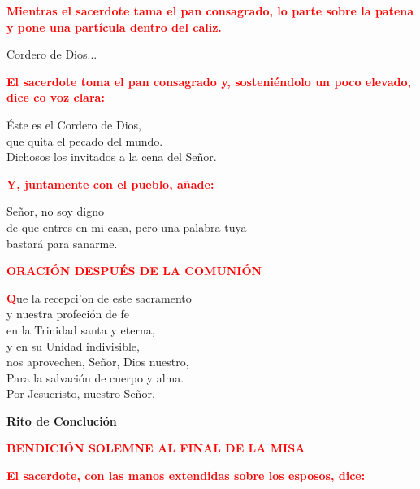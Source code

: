 \documentclass[12pt, letterpaper, spanish]{report}
\begin{document}
\large{\bfseries \textcolor{red}{Mientras el sacerdote tama el pan consagrado, lo parte sobre la patena y pone una part\'icula dentro del caliz.}}\newline

\Large Cordero de Dios...\newline

\large{\bfseries \textcolor{red}{El sacerdote toma el pan consagrado y, sosteni\'endolo un poco elevado, dice co voz clara:}}\newline

\Large \'Este es el Cordero de Dios,\\
que quita el pecado del mundo.\\
Dichosos los invitados a la cena del Se\~nor.\newline

\large{\bfseries \textcolor{red}{Y, juntamente con el pueblo, a\~nade:}}\newline

\Large Se\~nor, no soy digno\\
de que entres en mi casa,
pero una palabra tuya\\
bastar\'a para sanarme.\newline

\Large {\bfseries \textcolor{red}{ORACI\'ON DESPU\'ES DE LA COMUNI\'ON}} \newline

\Large \lettrine{\bfseries \textcolor{red}{Q}}{}ue la recepci'on de este sacramento\\
y nuestra profeci\'on de fe\\
en la Trinidad santa y eterna,\\
y en su Unidad indivisible,\\
nos aprovechen, Se\~nor, Dios nuestro,\\
Para la salvaci\'on de cuerpo y alma.\\
Por Jesucristo, nuestro Se\~nor.\newline

\begin{center}
\Huge {\bfseries Rito de Concluci\'on}
\end{center}

\Large {\bfseries \textcolor{red}{BENDICI\'ON SOLEMNE AL FINAL DE LA MISA}} \newline

\large{\bfseries \textcolor{red}{El sacerdote, con las manos extendidas sobre los esposos, dice:}}\newline
\end{document}

